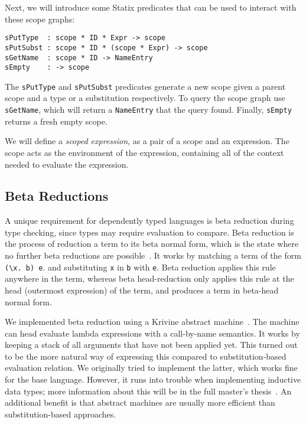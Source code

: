 \documentclass[a4paper,UKenglish,cleveref, autoref, thm-restate]{oasics-v2021}
\begin{document}
Next, we will introduce some Statix predicates that can be used to interact with these scope graphs:

\begin{lstlisting}
sPutType  : scope * ID * Expr -> scope
sPutSubst : scope * ID * (scope * Expr) -> scope
sGetName  : scope * ID -> NameEntry
sEmpty    : -> scope
\end{lstlisting}
The \verb|sPutType| and \verb|sPutSubst| predicates generate a new scope given a parent scope and a type or a substitution respectively. To query the scope graph use \verb|sGetName|, which will return a \verb|NameEntry| that the query found. Finally, \verb|sEmpty| returns a fresh empty scope.

We will define a \emph{scoped expression}, as a pair of a scope and an expression. The scope acts as the environment of the expression, containing all of the context needed to evaluate the expression. 

\subsection{Beta Reductions}
\label{sec:coc-dynsyms}

A unique requirement for dependently typed languages is beta reduction during type checking, since types may require evaluation to compare. Beta reduction is the process of reduction a term to its beta normal form, which is the state where no further beta reductions are possible~\cite{tapl}. It works by matching a term of the form \verb|(\x. b) e|. and substituting \verb|x| in \verb|b| with \verb|e|. Beta reduction applies this rule anywhere in the term, whereas beta head-reduction only applies this rule at the head (outermost expression) of the term, and produces a term in beta-head normal form. 

We implemented beta reduction using a Krivine abstract machine~\cite{krivine}. The machine can head evaluate lambda expressions with a call-by-name semantics. It works by keeping a stack of all arguments that have not been applied yet. This turned out to be the more natural way of expressing this compared to substitution-based evaluation relation. We originally tried to implement the latter, which works fine for the base language. However, it runs into trouble when implementing inductive data types; more information about this will be in the full master's thesis~\cite{thesis}. An additional benefit is that abstract machines are usually more efficient than substitution-based approaches.
\end{document}
